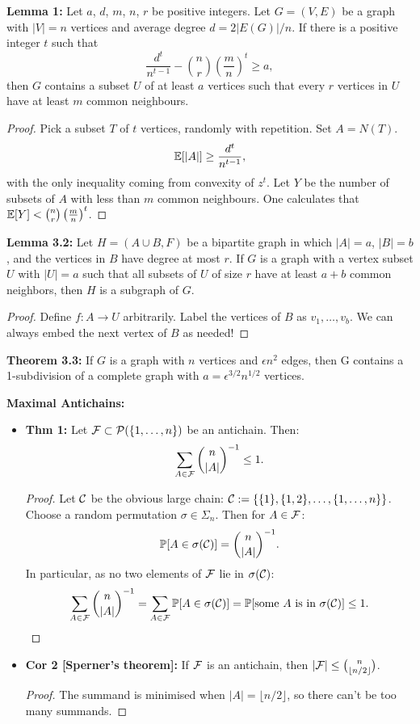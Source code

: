 \documentclass[11pt]{article}
\newenvironment{INT}[1][]{\begin{itemize}\small\item\textbf{#1}}{\end{itemize}}
\newcommand{\moreINT}[1][]{\item\textbf{#1}}
\begin{document}
\begin{recent}
\begin{itemise}
\textbf{Lemma 1:} Let $a$, $d$, $m$, $n$, $r$ be positive integers. Let $G = (V, E)$ be a graph with $|V | = n$ vertices and
average degree $d = 2|E(G)|/n$. If there is a positive integer $t$ such that
\[\frac{d^t}{n^{t-1}}-{n\choose r}\left(\frac{m}{n}\right)^t\geq a,\]
then $G$ contains a subset $U$ of at least $a$ vertices such that every $r$ vertices in $U$ have at least $m$ common neighbours.
\begin{proof}
Pick a subset $T$ of $t$ vertices, randomly with repetition.  Set $A=N(T)$.
\[\operatorname{\mathbb{E}}[|A|]\geq\frac{d^t}{n^{t-1}},\]
with the only inequality coming from convexity of $z^t$. Let $Y$ be the number of subsets of $A$ with less than $m$ common neighbours. One calculates that $\operatorname{\mathbb{E}}[Y]<{n\choose r}\left(\frac{m}{n}\right)^t$.
\end{proof}
\textbf{Lemma 3.2:} Let $H = (A\cup B, F )$ be a bipartite graph in which $|A| = a$,  $|B| = b$, and the vertices in
$B$ have degree at most $r$. If $G$ is a graph with a vertex subset $U$ with $|U| = a$ such that all subsets of
$U$ of size $r$ have at least $a + b$ common neighbors, then $H$ is a subgraph of $G$.
\begin{proof}
Define $f:A\to U$ arbitrarily. Label the vertices of $B$ as $v_1,\ldots,v_b$. We can always embed the next vertex of $B$ as needed!
\end{proof}
\textbf{Theorem 3.3:}
 If $G$ is a graph with $n$ vertices and $\epsilon n^2$
edges, then G contains a 1-subdivision of a
complete graph with $a = \epsilon^{3/2}n^{1/2}$
vertices.
\item \textbf{Maximal Antichains:}
\begin{INT}[Thm 1:] Let $\mathcal{F}\subset\mathcal{P}(\{1,\ldots,n\})$ be an antichain. Then:
\[\sum_{A\in\mathcal{F}}{n\choose|A|}^{-1}\leq1.\]
\begin{proof}
Let $\mathcal{C}$ be the obvious large chain: $\mathcal{C}:=\{\{1\},\{1,2\},\ldots,\{1,\ldots,n\}\}$. Choose a random permutation $\sigma\in\Sigma_n$. Then for $A\in\mathcal{F}$:%
\[\operatorname{\mathbb{P}}[A\in\sigma(\mathcal{C})]={n\choose |A|}^{-1}.\]
In particular, as no two elements of $\mathcal{F}$ lie in $\sigma(\mathcal{C})$:
\[\sum_{A\in\mathcal{F}}{n\choose |A|}^{-1}= \sum_{A\in\mathcal{F}}\operatorname{\mathbb{P}}[A\in\sigma(\mathcal{C})]=\operatorname{\mathbb{P}}[\textup{some $A$ is in $\sigma(\mathcal{C})$}]\leq1.\qedhere\]
\end{proof}
\moreINT[Cor 2 {[Sperner's theorem]}:]
If $\mathcal{F}$ is an antichain, then
$|\mathcal{F}|\leq{n\choose\lfloor n/2\rfloor}$.
\begin{proof}
The summand is minimised when $|A|=\lfloor n/2\rfloor$, so there can't be too many summands.

\end{proof}
\end{INT}
\end{itemise}
\end{recent}
\end{document}

